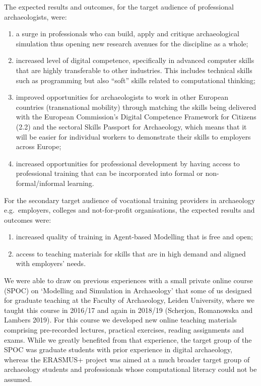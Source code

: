 \documentclass[
]{article}
\begin{document}
The expected results and outcomes, for the target audience of professional archaeologists, were:

\begin{enumerate}
\def\labelenumi{\arabic{enumi}.}
\item
  a surge in professionals who can build, apply and critique archaeological simulation thus opening new research avenues for the discipline as a whole;
\item
  increased level of digital competence, specifically in advanced computer skills that are highly transferable to other industries. This includes technical skills such as programming but also ``soft'' skills related to computational thinking;
\item
  improved opportunities for archaeologists to work in other European countries (transnational mobility) through matching the skills being delivered with the European Commission's Digital Competence Framework for Citizens (2.2) and the sectoral Skills Passport for Archaeology, which means that it will be easier for individual workers to demonstrate their skills to employers across Europe;
\item
  increased opportunities for professional development by having access to professional training that can be incorporated into formal or non-formal/informal learning.
\end{enumerate}

For the secondary target audience of vocational training providers in archaeology e.g.~employers, colleges and not-for-profit organisations, the expected results and outcomes were:

\begin{enumerate}
\def\labelenumi{\arabic{enumi}.}
\item
  increased quality of training in Agent-based Modelling that is free and open;
\item
  access to teaching materials for skills that are in high demand and aligned with employers' needs.
\end{enumerate}

We were able to draw on previous experiences with a small private online course (SPOC) on `Modelling and Simulation in Archaeology' that some of us designed for graduate teaching at the Faculty of Archaeology, Leiden University, where we taught this course in 2016/17 and again in 2018/19 (Scherjon, Romanowska and Lambers 2019). For this course we developed new online teaching materials comprising pre-recorded lectures, practical exercises, reading assignments and exams. While we greatly benefited from that experience, the target group of the SPOC was graduate students with prior experience in digital archaeology, whereas the ERASMUS+ project was aimed at a much broader target group of archaeology students and professionals whose computational literacy could not be assumed.
\end{document}
